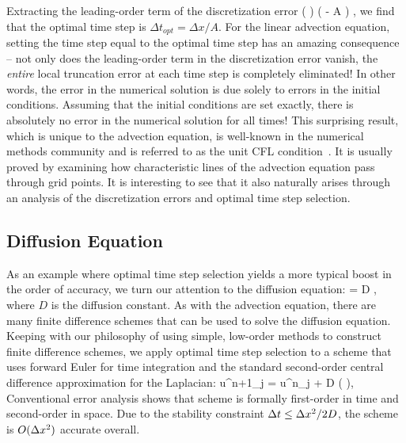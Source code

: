 \documentclass[oneeqnum,onefignum,onetabnum,onethmnum]{siamltex}
\begin{document}
Extracting the leading-order term of the discretization error
\beq
  \left(   \right)
  \left( \dx - A \dt \right) \dt,
\eeq
we find that the optimal time step is $\Delta t_{opt} = \Delta x / A$.
For the linear advection equation, setting the time step equal to the optimal 
time step has an amazing consequence -- not only does the leading-order term
in the discretization error vanish, the \emph{entire} local truncation 
error at each time step is completely eliminated!  In other words, the error 
in the numerical solution is due solely to errors in the initial conditions.
Assuming that the initial conditions are set exactly, there is absolutely no 
error in the numerical solution for all times!  
This surprising result, which is unique to the advection equation, is 
well-known in the numerical methods community and is referred to as the unit 
CFL condition~\cite{leveque_book_2002}.  It is usually proved by examining 
how characteristic lines of the advection equation pass through grid points.  
It is interesting to see that it also naturally arises through an analysis of 
the discretization errors and optimal time step selection.


\subsection{Diffusion Equation}
As an example where optimal time step selection yields a more typical boost 
in the order of accuracy, we turn our attention to the diffusion equation:
\beq
   = D ,
  \label{eq:diffusion_eqn_1d}
\eeq
where $D$ is the diffusion constant.  As with the advection equation,
there are many finite difference schemes that can be used to solve the 
diffusion equation.  Keeping with our philosophy of using simple, low-order 
methods to construct finite difference schemes, we apply optimal time step 
selection to a scheme that uses forward Euler for time integration and the 
standard second-order central difference approximation for the Laplacian:
\beq
  u^{n+1}_j = u^{n}_j 
  + D \dt 
    \left(  \right),
  \label{eq:diffusion_eqn_1d_FD_scheme}
\eeq
Conventional error analysis shows that scheme is formally first-order in time 
and second-order in space.  Due to the stability constraint 
$\Delta t \le \Delta x^2/2D$, the scheme is $O(\Delta x^2)$ accurate overall.
\end{document}
